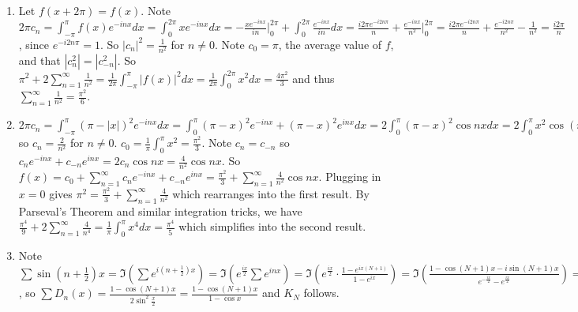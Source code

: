 \documentclass{article}
\begin{document}
\begin{enumerate}
\begin{enumerate}[(a)]
\item $\displaystyle\sum_{n=1}^{\infty} \frac{\sin^2 n\frac{\pi}{2}}{n^2\frac{\pi}{2}} = \frac{2}{\pi} \sum_{n=1}^{\infty} \frac{1}{(2n-1)^2} = \frac{\pi}{4} \Rightarrow \sum_{n=1}^{\infty} \frac{1}{(2n-1)^2} = \frac{\pi^2}{8}$.\\ \\
\end{enumerate}
\item Let $f(x+2\pi) = f(x)$. Note $2\pi c_n = \displaystyle  \int_{-\pi}^{\pi} f(x) e^{-inx} dx = \displaystyle  \int_{0}^{2\pi} x e^{-inx} dx=-\frac{xe^{-inx}}{in}\bigg|_{0}^{2\pi} + \int_{0}^{2\pi} \frac{e^{-inx}}{in} dx= \frac{i2\pi e^{-i2n\pi}}{n}+\frac{e^{-inx}}{n^2}\bigg|_{0}^{2\pi}=\frac{i2\pi e^{-i2n\pi}}{n}+\frac{e^{-i2n\pi}}{n^2} - \frac{1}{n^2} = \frac{i2\pi}{n}$, since $e^{-i2n\pi}=1$. So $|c_n|^2 = \frac{1}{n^2}$ for $n\neq 0$. Note $c_0=\pi$, the average value of $f$, and that $|c_{n}^2|=|c_{-n}^2|$. So $\pi^2 + 2\displaystyle\sum_{n=1}^{\infty} \frac{1}{n^2} =\frac{1}{2\pi}\int_{-\pi}^{\pi} |f(x)|^2 dx = \frac{1}{2\pi}\int_{0}^{2\pi} x^2 dx = \frac{4\pi^2}{3}$ and thus $\displaystyle\sum_{n=1}^{\infty} \frac{1}{n^2} = \frac{\pi^2}{6}$. \\
\item $2 \pi c_n = \displaystyle  \int_{-\pi}^{\pi} (\pi-|x|)^2 e^{-inx} dx = \int_{0}^{\pi} (\pi-x)^2 e^{-inx} + (\pi-x)^2 e^{inx}dx = 2\int_{0}^{\pi} (\pi-x)^2 \cos nx dx= 2\int_{0}^{\pi} x^2 \cos (n\pi-nx) dx = 4x \frac{\cos(n\pi-nx)}{n^2}\bigg|_{0}^{\pi}=\frac{4\pi}{n^2}$ so $c_n=\displaystyle \frac{2}{n^2}$ for $n\neq 0$. $c_0 = \displaystyle \frac{1}{\pi}\int_{0}^{\pi} x^2 = \frac{\pi^2}{3}$. Note $c_n=c_{-n}$ so $c_n e^{-in x} + c_{-n} e^{inx} = 2 c_n \cos nx = \frac{4}{n^2} \cos nx$. So $f(x) = c_0 + \displaystyle\sum_{n=1}^{\infty} c_n e^{-in x} + c_{-n} e^{inx} = \displaystyle \frac{\pi^2}{3} + \sum_{n=1}^{\infty} \frac{4}{n^2} \cos nx$. Plugging in $x=0$ gives $\pi^2 = \displaystyle \frac{\pi^2}{3} + \sum_{n=1}^{\infty} \frac{4}{n^2}$ which rearranges into the first result. By Parseval's Theorem and similar integration tricks, we have $\displaystyle \frac{\pi^4}{9} + 2\sum_{n=1}^{\infty} \frac{4}{n^4}=\frac{1}{\pi}\int_{0}^{\pi} x^4 dx = \frac{\pi^4}{5}$ which simplifies into the second result.\\
\item Note $\sum \sin (n+\frac{1}{2}) x = \Im(\sum e^{i(n+\frac{1}{2})x})=\Im(e^{\frac{ix}{2}} \sum e^{inx})=\Im(e^{\frac{ix}{2}} \cdot \frac{1-e^{ix(N+1)}}{1-e^{ix}})=\Im(\frac{1-\cos (N+1)x - i \sin (N+1) x}{e^{-\frac{ix}{2}} - e^{\frac{ix}{2}}})=\frac{1-\cos(N+1)x}{2\sin \frac{x}{2}}$, so $\sum D_n (x) = \frac{1-\cos(N+1)x}{2\sin^2 \frac{x}{2}}=\frac{1-\cos(N+1)x}{1- \cos x}$ and $K_N$ follows. \\

\end{enumerate}
\end{document}
